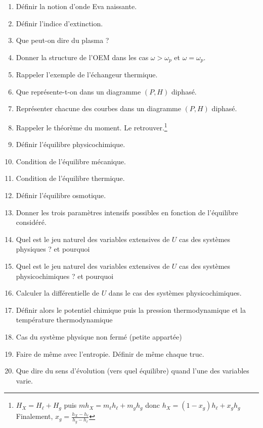 \documentclass[a4paper, 11pt, hidelinks]{article}
\begin{document}
\begin{enumerate}
    \item Définir la notion d'onde Eva naissante. \cite{Chapitre16}
    \item Définir l'indice d'extinction. \cite{Chapitre16}
    \item Que peut-on dire du plasma ? \cite{Chapitre16}
    \item Donner la structure de l'OEM dans les cas $\omega > \omega_p$ et $\omega=\omega_p$. \cite{Chapitre16}
    \item Rappeler l'exemple de l'échangeur thermique. \cite{Chapitre19}
    \item Que représente-t-on dans un diagramme $(P,H)$ diphasé. \cite{Chapitre19}
    \item Représenter chacune des courbes dans un diagramme $(P,H)$ diphasé. \cite{Chapitre19}
    \item Rappeler le théorème du moment. Le retrouver.\footnote{$H_X=H_\ell + H_g$ puis $mh_X=m_\ell h_\ell + m_g h_g$ donc $h_X=(1-x_g)h_\ell + x_g h_g$ Finalement, $x_g = \frac{h_X-h_\ell}{h_g-h_\ell}$} \cite{Chapitre19}
    \item Définir l'équilibre physicochimique. \cite{Chapitre1bis}
    \item Condition de l'équilibre mécanique. \cite{Chapitre1bis}
    \item Condition de l'équilibre thermique. \cite{Chapitre1bis}
    \item Définir l'équilibre osmotique. \cite{Chapitre1bis}
    \item Donner les trois paramètres intensifs possibles en fonction de l'équilibre considéré. \cite{Chapitre1bis}
    \item Quel est le jeu naturel des variables extensives de $U$ cas des systèmes physiques ? et pourquoi \cite{Chapitre1bis}
    \item Quel est le jeu naturel des variables extensives de $U$ cas des systèmes physicochimiques ? et pourquoi \cite{Chapitre1bis}
    \item Calculer la différentielle de $U$ dans le cas des systèmes physicochimiques. \cite{Chapitre1bis}
    \item Définir alors le potentiel chimique puis la pression thermodynamique et la température thermodynamique \cite{Chapitre1bis}
    \item Cas du système physique non fermé (petite appartée) \cite{Chapitre1bis}
    \item Faire de même avec l'entropie. Définir de même chaque truc. \cite{Chapitre1bis}
    \item Que dire du sens d'évolution (vers quel équilibre) quand l'une des variables varie. \cite{Chapitre1bis}

\end{enumerate}
\end{document}
